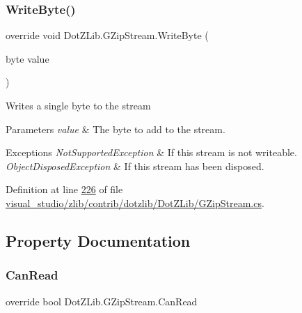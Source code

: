\subsubsection{\texorpdfstring{Write\+Byte()}{WriteByte()}\hspace{0.1cm}{\footnotesize\ttfamily [2/2]}}
{\footnotesize\ttfamily override void Dot\+Z\+Lib.\+G\+Zip\+Stream.\+Write\+Byte (\begin{DoxyParamCaption}\item[{byte}]{value }\end{DoxyParamCaption})\hspace{0.3cm}{\ttfamily [inline]}}



Writes a single byte to the stream 


\begin{DoxyParams}{Parameters}
{\em value} & The byte to add to the stream.\\
\hline
\end{DoxyParams}

\begin{DoxyExceptions}{Exceptions}
{\em Not\+Supported\+Exception} & If this stream is not writeable.\\
\hline
{\em Object\+Disposed\+Exception} & If this stream has been disposed.\\
\hline
\end{DoxyExceptions}


Definition at line \hyperlink{visual__studio_2zlib_2contrib_2dotzlib_2_dot_z_lib_2_g_zip_stream_8cs_source_l00226}{226} of file \hyperlink{visual__studio_2zlib_2contrib_2dotzlib_2_dot_z_lib_2_g_zip_stream_8cs_source}{visual\+\_\+studio/zlib/contrib/dotzlib/\+Dot\+Z\+Lib/\+G\+Zip\+Stream.\+cs}.



\subsection{Property Documentation}
\mbox{\label{class_dot_z_lib_1_1_g_zip_stream_a627994338e73782d92b51422a1e36fcc}} 
\subsubsection{\texorpdfstring{Can\+Read}{CanRead}}
{\footnotesize\ttfamily override bool Dot\+Z\+Lib.\+G\+Zip\+Stream.\+Can\+Read\hspace{0.3cm}{\ttfamily [get]}}



